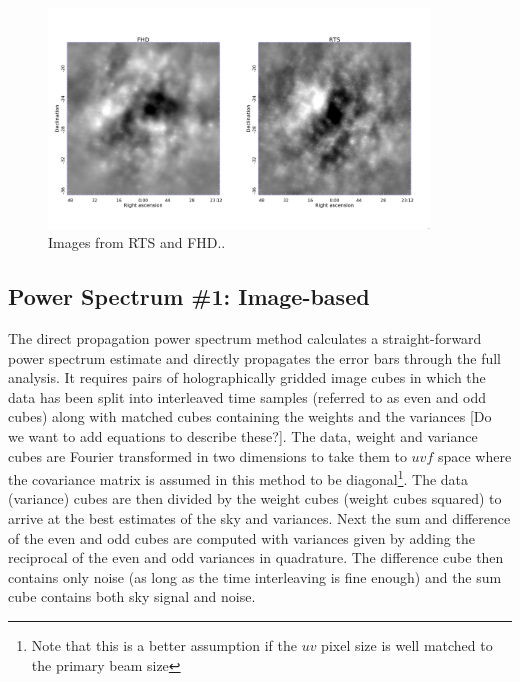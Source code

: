 \documentclass[preprint2]{aastex}
\begin{document}
\begin{figure}[h!]
\begin{center}
\includegraphics[width=0.9\textwidth]{figures/image_compare/image_compare.png}
\caption{Images from RTS and FHD.. \label{fig:image_compare}}
\end{center}
\end{figure}

\subsection{Power Spectrum \#1: Image-based}
\label{sec:EPPSILON}
The direct propagation power spectrum method calculates a straight-forward power spectrum estimate and directly propagates the error bars through the full analysis. It requires pairs of holographically gridded image cubes in which the data has been split into interleaved time samples (referred to as even and odd cubes) along with matched cubes containing the weights and the variances [Do we want to add equations to describe these?].  The data, weight and variance cubes are Fourier transformed in two dimensions to take them to $uvf$ space where the covariance matrix is assumed in this method to be diagonal\footnote{Note that this is a better assumption if the $uv$ pixel size is well matched to the primary beam size}. The data (variance) cubes are then divided by the weight cubes (weight cubes squared) to arrive at the best estimates of the sky and variances. Next the sum and difference of the even and odd cubes are computed with variances given by adding the reciprocal of the even and odd variances in quadrature. The difference cube then contains only noise (as long as the time interleaving is fine enough) and the sum cube contains both sky signal and noise.
\end{document}

